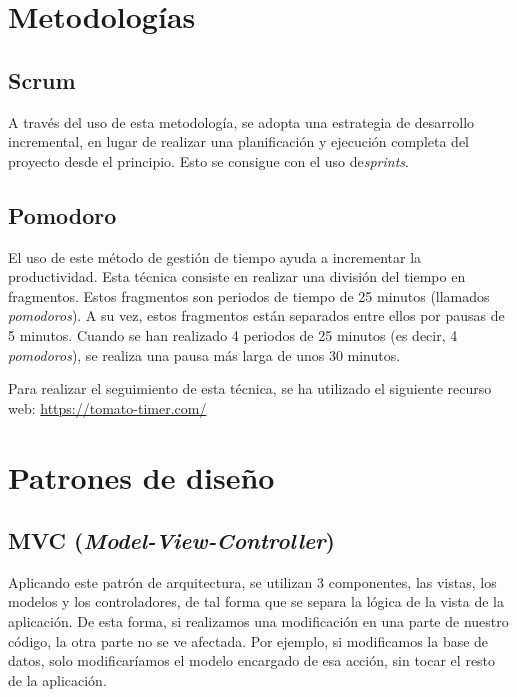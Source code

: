 
\section{Metodologías}\label{metodologias}


\subsection{Scrum}\label{scrum}

A través del uso de esta metodología, se adopta una estrategia de desarrollo incremental, en lugar de realizar una planificación y ejecución completa del proyecto desde el principio. Esto se consigue con el uso de\emph{sprints}.

\subsection{Pomodoro}\label{pomodoro}

El uso de este método de gestión de tiempo ayuda a incrementar la productividad. Esta técnica consiste en realizar una división del tiempo en fragmentos. Estos fragmentos son periodos de tiempo de 25 minutos (llamados \emph{pomodoros}). A su vez, estos fragmentos están separados entre ellos por pausas de 5 minutos. Cuando se han realizado 4 periodos de 25 minutos (es decir, 4 \emph{pomodoros}), se realiza una pausa más larga de unos 30 minutos.

Para realizar el seguimiento de esta técnica, se ha utilizado el siguiente recurso web: \href{https://tomato-timer.com/}{https://tomato-timer.com/}

\section{Patrones de diseño}\label{patrones_de_diseño}

\subsection{MVC (\emph{Model-View-Controller})}\label{mode-view-conroller}

Aplicando este patrón de arquitectura, se utilizan 3 componentes, las vistas, los modelos y los controladores, de tal forma que se separa la lógica de la vista de la aplicación. De esta forma, si realizamos una modificación en una parte de nuestro código, la otra parte no se ve afectada. Por ejemplo, si modificamos la base de datos, solo modificaríamos el modelo encargado de esa acción, sin tocar el resto de la aplicación.

